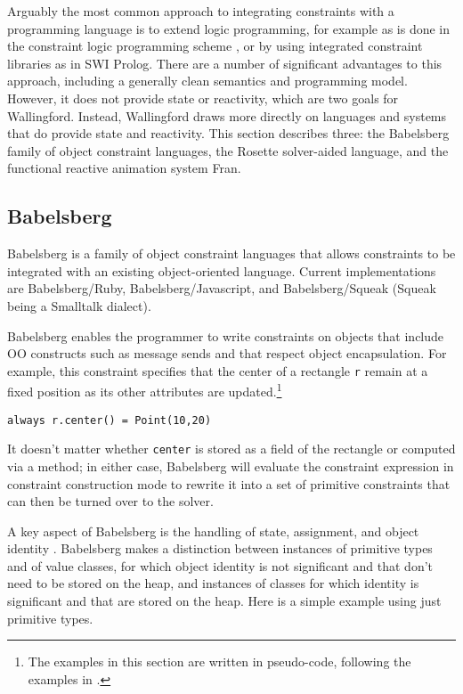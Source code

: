 \documentclass[reprint]{sigplanconf}
\begin{document}
Arguably the most common approach to integrating constraints with a
programming language is to extend logic programming, for example as is
done in the constraint logic programming scheme
\cite{jaffar-popl-1987}, or by using integrated constraint libraries
as in SWI Prolog.  There are a number of significant advantages to
this approach, including a generally clean semantics and programming
model.  However, it does not provide state or reactivity, which are
two goals for Wallingford.  Instead, Wallingford draws more directly
on languages and systems that do provide state and reactivity.  This
section describes three: the Babelsberg family of object constraint
languages, the Rosette solver-aided language, and the functional
reactive animation system Fran.

\subsection{Babelsberg}
\label{sec:babelsberg}

Babelsberg is a family of
object constraint languages that allows constraints to be integrated with
an existing object-oriented language.  Current
implementations are Babelsberg/Ruby, Babelsberg/Javascript, and
Babelsberg/Squeak (Squeak being a Smalltalk dialect).

Babelsberg enables the programmer to write constraints on objects that
include OO constructs such as message sends and that respect object
encapsulation.  For example, this constraint specifies that the center
of a rectangle \verb|r| remain at a fixed position as its other
attributes are updated.\footnote{The examples in this section are
  written in pseudo-code, following the examples in 
  \cite{felgentreff-step-by-step-tr}.}

\begin{verbatim}
always r.center() = Point(10,20)
\end{verbatim}

It doesn't matter whether \verb|center| is stored as a field of the
rectangle or computed via a method; in either case, Babelsberg will
evaluate the constraint expression in constraint construction mode to
rewrite it into a set of primitive constraints that can then be turned over
to the solver.

A key aspect of Babelsberg is the handling of state, assignment, and object
identity \cite{felgentreff-oopsla-2015}.  Babelsberg makes a distinction
between instances of primitive types and of value classes, for which object
identity is not significant and that don't need to be stored on the heap,
and instances of classes for which identity is significant and that are
stored on the heap.  Here is a simple example using just primitive types.
\end{document}
